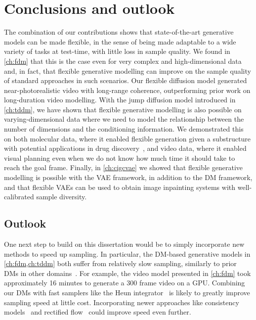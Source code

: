 \chapter{Conclusions and outlook}  \label{ch:conclusion}

The combination of our contributions shows that state-of-the-art generative models can be made flexible, in the sense of being made adaptable to a wide variety of tasks at test-time, with little loss in sample quality. 
%
We found in \cref{ch:fdm} that this is the case even for very complex and high-dimensional data and, in fact, that flexible generative modelling can improve on the sample quality of standard approaches in such scenarios. Our flexible diffusion model generated near-photorealistic video with long-range coherence, outperforming prior work on long-duration video modelling.
%
With the jump diffusion model introduced in \cref{ch:tddm}, we have shown that flexible generative modelling is also possible on varying-dimensional data where we need to model the relationship between the number of dimensions and the conditioning information. We demonstrated this on both molecular data, where it enabled flexible generation given a substructure with potential applications in drug discovery~\citep{hoogeboom2022equivariant}, and video data, where it enabled visual planning even when we do not know how much time it should take to reach the goal frame.
%
Finally, in \cref{ch:cigcvae} we showed that flexible generative modelling is possible with the VAE framework, in addition to the DM framework, and that flexible VAEs can be used to obtain image inpainting systems with well-calibrated sample diversity.


\section*{Outlook}

One next step to build on this dissertation would be to simply incorporate new methods to speed up sampling. In particular, the DM-based generative models in \cref{ch:fdm,ch:tddm} both suffer from relatively slow sampling, similarly to prior DMs in other domains~\citep{ho2020denoising,song2020score}. For example, the video model presented in \cref{ch:fdm} took approximately 16 minutes to generate a 300 frame video on a GPU.  Combining our DMs with fast samplers like the Heun integrator~\citep{karras2022elucidating} is likely to greatly improve sampling speed at little cost. Incorporating newer approaches like consistency models~\citep{song2023consistency} and rectified flow~\citep{esser2024scaling} could improve speed even further. 

